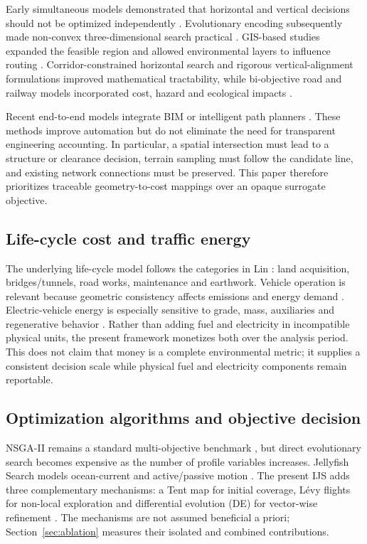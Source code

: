 \documentclass[preprint,12pt]{elsarticle}
\begin{document}
Early simultaneous models demonstrated that horizontal and vertical decisions should not be optimized independently \cite{chew1989}. Evolutionary encoding subsequently made non-convex three-dimensional search practical \cite{jong2003}. GIS-based studies expanded the feasible region and allowed environmental layers to influence routing \cite{kang2012,davey2017}. Corridor-constrained horizontal search \cite{mondal2015} and rigorous vertical-alignment formulations \cite{akhmet2022} improved mathematical tractability, while bi-objective road and railway models incorporated cost, hazard and ecological impacts \cite{hirpa2016,zhang2020,song2022}.

Recent end-to-end models integrate BIM or intelligent path planners \cite{han2023,pu2024}. These methods improve automation but do not eliminate the need for transparent engineering accounting. In particular, a spatial intersection must lead to a structure or clearance decision, terrain sampling must follow the candidate line, and existing network connections must be preserved. This paper therefore prioritizes traceable geometry-to-cost mappings over an opaque surrogate objective.

\subsection{Life-cycle cost and traffic energy}

The underlying life-cycle model follows the categories in Lin \cite{lin2025}: land acquisition, bridges/tunnels, road works, maintenance and earthwork. Vehicle operation is relevant because geometric consistency affects emissions and energy demand \cite{llopis2019}. Electric-vehicle energy is especially sensitive to grade, mass, auxiliaries and regenerative behavior \cite{dimartino2022}. Rather than adding fuel and electricity in incompatible physical units, the present framework monetizes both over the analysis period. This does not claim that money is a complete environmental metric; it supplies a consistent decision scale while physical fuel and electricity components remain reportable.

\subsection{Optimization algorithms and objective decision}

NSGA-II remains a standard multi-objective benchmark \cite{deb2002}, but direct evolutionary search becomes expensive as the number of profile variables increases. Jellyfish Search models ocean-current and active/passive motion \cite{chou2021}. The present IJS adds three complementary mechanisms: a Tent map for initial coverage, L\'evy flights for non-local exploration and differential evolution (DE) for vector-wise refinement \cite{storn1997}. The mechanisms are not assumed beneficial a priori; Section~\ref{sec:ablation} measures their isolated and combined contributions.
\end{document}
